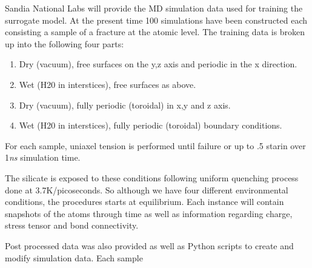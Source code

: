 
Sandia National Labs will provide the MD simulation data used for training the surrogate model. At the present time 100 simulations have been constructed each consisting a sample of a fracture at the atomic level. The training data is broken up into the following four parts:

\begin{enumerate}
    \item Dry (vacuum), free surfaces on the y,z axis and periodic in the x direction.
    \item Wet (H20 in interstices), free surfaces as above. 
    \item Dry (vacuum), fully periodic (toroidal) in x,y and z axis.
    \item Wet (H20 in interstices), fully periodic (toroidal) boundary conditions. 
\end{enumerate}

For each sample, uniaxel tension is performed until failure or up to .5 starin over 1\textit{ns} simulation time. 

The silicate is exposed to these conditions following uniform quenching process done at 3.7K/picoseconds. So although we have four different environmental conditions, the procedures starts at equilibrium.
Each instance will contain snapshots of the atoms through time as well as information regarding charge, stress tensor and bond connectivity. 

Post processed data was also provided as well as Python scripts to create and modify simulation data. Each sample 

